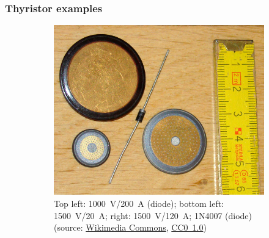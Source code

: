 \begin{frame}[b]
    \frametitle{Thyristor examples}
    \begin{figure}
        \begin{subfigure}{0.45\textwidth}
            \centering
			\includegraphics[height=0.45\textheight]{fig/lec05/Thyristor_example_01.jpg}
			\caption{Top left: \SI{1000}{\volt}/\SI{200}{\ampere} (diode); bottom left: \SI{1500}{\volt}/\SI{20}{\ampere}; right: \SI{1500}{\volt}/\SI{120}{\ampere}; 1N4007 (diode) (source: \href{https://de.wikipedia.org/wiki/Datei:SCR_power_rectifiers.jpg}{Wikimedia Commons}, \href{https://creativecommons.org/publicdomain/zero/1.0/}{CC0~1.0})}
        \end{subfigure}
        \hspace{1cm}
        \begin{subfigure}{0.45\textwidth}
            \centering

\end{subfigure}
\end{figure}
\end{frame}

